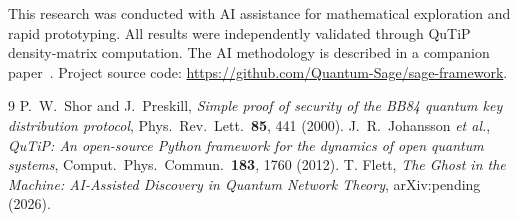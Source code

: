 \documentclass[aps,pra,reprint,amsmath,amssymb,superscriptaddress]{revtex4-2}
\begin{document}
\begin{acknowledgments}
This research was conducted with AI assistance for mathematical exploration and rapid prototyping. All results were independently validated through QuTiP density-matrix computation. The AI methodology is described in a companion paper~\cite{paper2}. Project source code: \url{https://github.com/Quantum-Sage/sage-framework}.
\end{acknowledgments}



\begin{thebibliography}{9}
 P.~W.~Shor and J.~Preskill, \emph{Simple proof of security of the BB84 quantum key distribution protocol}, Phys.\ Rev.\ Lett.\ \textbf{85}, 441 (2000).
 J.~R.~Johansson \emph{et al.}, \emph{QuTiP: An open-source Python framework for the dynamics of open quantum systems}, Comput.\ Phys.\ Commun.\ \textbf{183}, 1760 (2012).
 T. Flett, \emph{The Ghost in the Machine: AI-Assisted Discovery in Quantum Network Theory}, arXiv:pending (2026).
\end{thebibliography}
\end{document}
